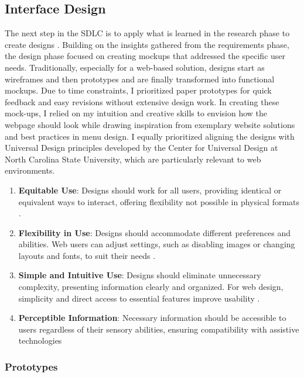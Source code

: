 \documentclass[10pt,twocolumn]{article}
\begin{document}
\subsection{Interface Design}
The next step in the SDLC is to apply what is learned in the research phase to create designs \cite{Web2009} . Building on the insights gathered from the requirements phase, the design phase focused on creating mockups that addressed the specific user needs. Traditionally, especially for a web-based solution, designs start as wireframes and then prototypes and are finally transformed into functional mockups. Due to time constraints, I prioritized paper prototypes for quick feedback and easy revisions without extensive design work. In creating these mock-ups, I relied on my intuition and creative skills to envision how the webpage should look while drawing inspiration from exemplary website solutions and best practices in menu design. I equally prioritized aligning the designs with Universal Design principles developed by the Center for Universal Design at North Carolina State University, which are particularly relevant to web environments.
\vspace{-1em}
\begin{enumerate}
   \item \textbf{Equitable Use}: Designs should work for all users, providing identical or equivalent ways to interact, offering flexibility not possible in physical formats \cite{Web2009}.
    \item \textbf{Flexibility in Use}: Designs should accommodate different preferences and abilities. Web users can adjust settings, such as disabling images or changing layouts and fonts, to suit their needs \cite{Web2009}.
    \item \textbf{Simple and Intuitive Use}: Designs should eliminate unnecessary complexity, presenting information clearly and organized. For web design, simplicity and direct access to essential features improve usability \cite{Web2009}.
    \item \textbf{Perceptible Information}: Necessary information should be accessible to users regardless of their sensory abilities, ensuring compatibility with assistive technologies \cite{Web2009}
\end{enumerate}

\subsubsection{Prototypes}
\end{document}
